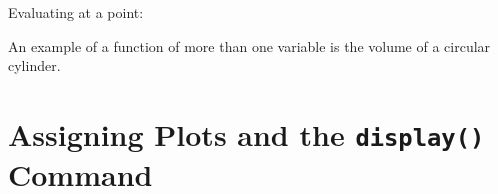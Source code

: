 \begin{maplegroup}
\begin{mapleinput}
\end{mapleinput}
\mapleresult
\begin{maplelatex}
\end{maplelatex}
\end{maplegroup}

\noindent
Evaluating at a point:

\begin{maplegroup}
\begin{mapleinput}
\end{mapleinput}
\mapleresult
\begin{maplelatex}
\end{maplelatex}
\end{maplegroup}


An example of a function of more than one variable is the volume of a circular cylinder.

\begin{maplegroup}
\begin{mapleinput}
\end{mapleinput}
\mapleresult
\begin{maplelatex}
\end{maplelatex}
\end{maplegroup}

\begin{maplegroup}
\begin{mapleinput}
\end{mapleinput}
\mapleresult
\begin{maplelatex}
\end{maplelatex}
\end{maplegroup}

\section{Assigning Plots and the \texttt{display()} Command} \label{sec:display_command}

